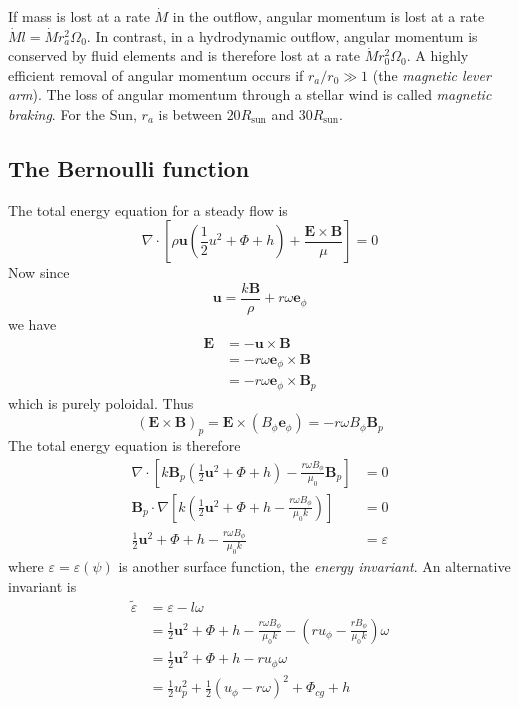 \documentclass{jknotes}
\newcommand{\B}{\symbf{B}}
\renewcommand{\u}{\symbf{u}}
\newcommand{\veps}{\varepsilon}
\begin{document}
If mass is lost at a rate $\dot{M}$ in the outflow, angular momentum is lost
at a rate $\dot{M} l = \dot{M} r_a^2 \Omega_0$. In contrast, in a hydrodynamic
outflow, angular momentum is conserved by fluid elements and is therefore lost
at a rate $\dot{M}r_0^2 \Omega_0$. A highly efficient removal of angular
momentum occurs if $r_a/r_0 \gg 1$ (the \emph{magnetic lever arm}). The loss
of angular momentum through a stellar wind is called \emph{magnetic braking}.
For the Sun, $r_a$ is between $20 R_{\text{sun}}$ and $30 R_{\text{sun}}$.

\subsection{The Bernoulli function}
The total energy equation for a steady flow is
\begin{equation}
	\nabla \cdot \left[ \rho \u(\frac{1}{2}u^2 + \Phi + h) +
	\frac{\symbf{E}\times\B}{\mu}\right] = 0
\end{equation}
Now since
\begin{equation}
	\u = \frac{k\B}{\rho} + r \omega \symbf{e}_\phi
\end{equation}
we have
\begin{align}
	\symbf{E} &= -\u \times \B \\
			  &= -r \omega \symbf{e}_\phi \times \B \\
			  &= -r\omega \symbf{e}_\phi \times \B_p
\end{align}
which is purely poloidal. Thus
\begin{equation}
	(\symbf{E}\times\B)_p = \symbf{E} \times (B_\phi \symbf{e}_\phi) =
	-r\omega B_\phi \B_p
\end{equation}
The total energy equation is therefore
\begin{align}
	\nabla \cdot \left[ k \B_p(\frac{1}{2}\u^2 + \Phi + h) - \frac{r\omega
	B_\phi}{\mu_0}\B_p\right] &= 0\\
	\B_p \cdot \nabla \left[ k\left(\frac{1}{2}\u^2 + \Phi + h -\frac{r\omega
	B_\phi}{\mu_0 k}\right)\right] &= 0\\
	\frac{1}{2}\u^2 + \Phi + h -\frac{r\omega B_\phi}{\mu_0 k} &= \veps 
\end{align}
where $\veps = \veps(\psi)$ is another surface function, the \emph{energy
invariant}. An alternative invariant is
\begin{align}
	\tilde{\veps} &= \veps - l\omega \\
				  &= \frac{1}{2}\u^2 + \Phi + h -\frac{r\omega B_\phi}{\mu_0
				  k} - \left(ru_\phi - \frac{rB_\phi}{\mu_0 k}\right)\omega \\
				  &= \frac{1}{2}\u^2 + \Phi + h - ru_\phi \omega \\
				  &= \frac{1}{2}u_p^2 + \frac{1}{2}(u_\phi - r\omega)^2 +
				  \Phi_{cg} + h
\end{align}
\end{document}
